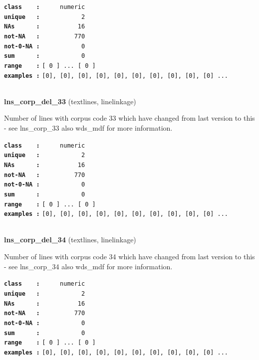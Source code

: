 \documentclass[]{article}
\begin{document}
\textbf{\texttt{class\ \ \ \ :}} \texttt{~~~~~numeric}\\
\textbf{\texttt{unique\ \ \ :}} \texttt{~~~~~~~~~~~2}\\
\textbf{\texttt{NAs\ \ \ \ \ \ :}} \texttt{~~~~~~~~~~16}\\
\textbf{\texttt{not-NA\ \ \ :}} \texttt{~~~~~~~~~770}\\
\textbf{\texttt{not-0-NA\ :}} \texttt{~~~~~~~~~~~0}\\
\textbf{\texttt{sum\ \ \ \ \ \ :}} \texttt{~~~~~~~~~~~0}\\
\textbf{\texttt{range\ \ \ \ :}}
\texttt{{[}\ 0\ {]}\ ...\ {[}\ 0\ {]}}\\
\textbf{\texttt{examples\ :}}
\texttt{{[}0{]},\ {[}0{]},\ {[}0{]},\ {[}0{]},\ {[}0{]},\ {[}0{]},\ {[}0{]},\ {[}0{]},\ {[}0{]},\ {[}0{]}\ ...}\\

~

\textbf{lns\_corp\_del\_33} (textlines, linelinkage)

Number of lines with corpus code 33 which have changed from last version
to this - see lns\_corp\_33 also wds\_mdf for more information.

\textbf{\texttt{class\ \ \ \ :}} \texttt{~~~~~numeric}\\
\textbf{\texttt{unique\ \ \ :}} \texttt{~~~~~~~~~~~2}\\
\textbf{\texttt{NAs\ \ \ \ \ \ :}} \texttt{~~~~~~~~~~16}\\
\textbf{\texttt{not-NA\ \ \ :}} \texttt{~~~~~~~~~770}\\
\textbf{\texttt{not-0-NA\ :}} \texttt{~~~~~~~~~~~0}\\
\textbf{\texttt{sum\ \ \ \ \ \ :}} \texttt{~~~~~~~~~~~0}\\
\textbf{\texttt{range\ \ \ \ :}}
\texttt{{[}\ 0\ {]}\ ...\ {[}\ 0\ {]}}\\
\textbf{\texttt{examples\ :}}
\texttt{{[}0{]},\ {[}0{]},\ {[}0{]},\ {[}0{]},\ {[}0{]},\ {[}0{]},\ {[}0{]},\ {[}0{]},\ {[}0{]},\ {[}0{]}\ ...}\\

~

\textbf{lns\_corp\_del\_34} (textlines, linelinkage)

Number of lines with corpus code 34 which have changed from last version
to this - see lns\_corp\_34 also wds\_mdf for more information.

\textbf{\texttt{class\ \ \ \ :}} \texttt{~~~~~numeric}\\
\textbf{\texttt{unique\ \ \ :}} \texttt{~~~~~~~~~~~2}\\
\textbf{\texttt{NAs\ \ \ \ \ \ :}} \texttt{~~~~~~~~~~16}\\
\textbf{\texttt{not-NA\ \ \ :}} \texttt{~~~~~~~~~770}\\
\textbf{\texttt{not-0-NA\ :}} \texttt{~~~~~~~~~~~0}\\
\textbf{\texttt{sum\ \ \ \ \ \ :}} \texttt{~~~~~~~~~~~0}\\
\textbf{\texttt{range\ \ \ \ :}}
\texttt{{[}\ 0\ {]}\ ...\ {[}\ 0\ {]}}\\
\textbf{\texttt{examples\ :}}
\texttt{{[}0{]},\ {[}0{]},\ {[}0{]},\ {[}0{]},\ {[}0{]},\ {[}0{]},\ {[}0{]},\ {[}0{]},\ {[}0{]},\ {[}0{]}\ ...}\\
\end{document}

